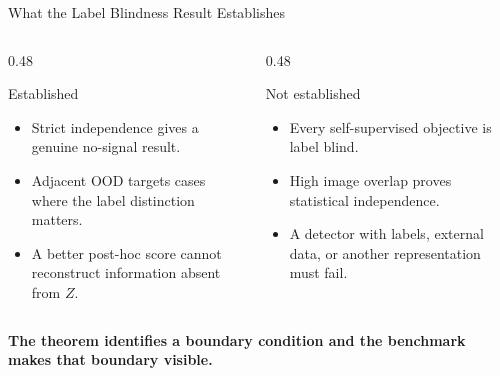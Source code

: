 \documentclass[aspectratio=1610]{beamer}
\begin{document}
\begin{frame}{What the Label Blindness Result Establishes}
\begin{columns}[T]
\begin{column}{0.48\textwidth}
\begin{block}{Established}
\begin{itemize}
  \item Strict independence gives a genuine no-signal result.
  \item Adjacent OOD targets cases where the label distinction matters.
  \item A better post-hoc score cannot reconstruct information absent from $Z$.
\end{itemize}
\end{block}
\end{column}
\begin{column}{0.48\textwidth}
\begin{alertblock}{Not established}
\begin{itemize}
  \item Every self-supervised objective is label blind.
  \item High image overlap proves statistical independence.
  \item A detector with labels, external data, or another representation must fail.
\end{itemize}
\end{alertblock}
\end{column}
\end{columns}

\vfill
\begin{center}
  \textbf{The theorem identifies a boundary condition and the benchmark makes that boundary visible.}
\end{center}
\end{frame}
\end{document}
